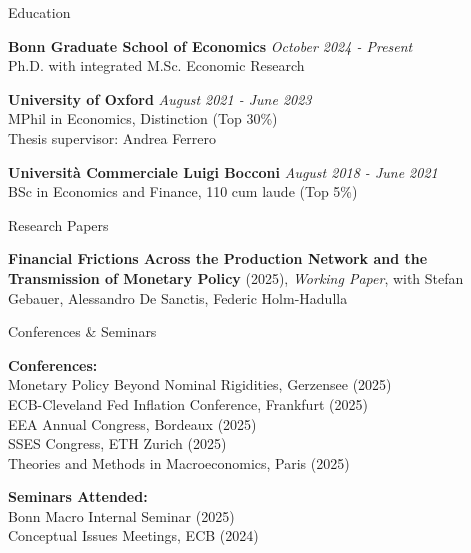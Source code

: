 \documentclass{resume} %
\begin{document}
\begin{rSection}{Education}

{\bf Bonn Graduate School of Economics} \hfill {\em October 2024 - Present} \\
Ph.D. with integrated M.Sc. Economic Research

{\bf University of Oxford} \hfill {\em August 2021 - June 2023} \\
MPhil in Economics, Distinction (Top 30\%) \\
Thesis supervisor: Andrea Ferrero

{\bf Università Commerciale Luigi Bocconi} \hfill {\em August 2018 - June 2021} \\
BSc in Economics and Finance, 110 cum laude (Top 5\%)

\end{rSection}

\begin{rSection}{Research Papers}

{\bf Financial Frictions Across the Production Network and the Transmission of Monetary Policy} (2025), \textit{Working Paper}, with Stefan Gebauer, Alessandro De Sanctis, Federic Holm-Hadulla

\end{rSection}

\begin{rSection}{Conferences \& Seminars}

\textbf{Conferences:} \\
Monetary Policy Beyond Nominal Rigidities, Gerzensee (2025) \\
ECB-Cleveland Fed Inflation Conference, Frankfurt (2025) \\
EEA Annual Congress, Bordeaux (2025) \\
SSES Congress, ETH Zurich (2025) \\
Theories and Methods in Macroeconomics, Paris (2025)

\textbf{Seminars Attended:} \\
Bonn Macro Internal Seminar (2025) \\
Conceptual Issues Meetings, ECB (2024)

\end{rSection}
\end{document}
